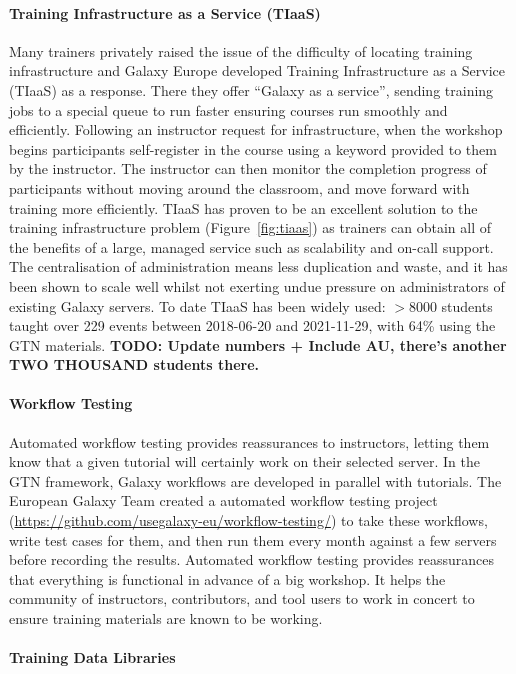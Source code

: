 \documentclass[10pt,letterpaper]{article}
\begin{document}
\paragraph*{Training Infrastructure as a Service (TIaaS)}
Many trainers privately raised the issue of the difficulty of locating training infrastructure and Galaxy Europe developed Training Infrastructure as a Service (TIaaS) \cite{Rasche2020} as a response. There they offer ``Galaxy as a service'', sending training jobs to a special queue to run faster ensuring courses run smoothly and efficiently. Following an instructor request for infrastructure, when the workshop begins participants self-register in the course using a keyword provided to them by the instructor. The instructor can then monitor the completion progress of participants without moving around the classroom, and move forward with training more efficiently. TIaaS has proven to be an excellent solution to the training infrastructure problem (Figure~\ref{fig:tiaas}) as trainers can obtain all of the benefits of a large, managed service such as scalability and on-call support. The centralisation of administration means less duplication and waste, and it has been shown to scale well whilst not exerting undue pressure on administrators of existing Galaxy servers. To date TIaaS has been widely used: $>8000$ students taught over 229 events between 2018-06-20 and 2021-11-29, with 64\% using the GTN materials. \textbf{TODO: Update numbers + Include AU, there's another TWO THOUSAND students there.}


\paragraph*{Workflow Testing}
Automated workflow testing provides reassurances to instructors, letting them know that a given tutorial will certainly work on their selected server.
In the GTN framework, Galaxy workflows are developed in parallel with tutorials. The European Galaxy Team created a automated workflow testing project (\url{https://github.com/usegalaxy-eu/workflow-testing/}) to take these workflows, write test cases for them, and then run them every month against a few servers before recording the results. Automated workflow testing provides reassurances that everything is functional in advance of a big workshop. It helps the community of instructors, contributors, and tool users to work in concert to ensure training materials are known to be working.

\paragraph*{Training Data Libraries}
\end{document}

